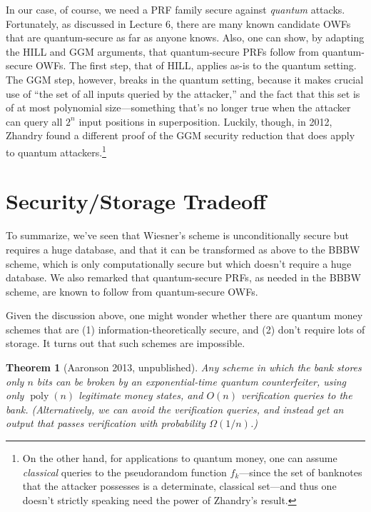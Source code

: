 \documentclass[12pt]{report}
\theoremstyle{plain}
\newtheorem{theorem}{Theorem}[section]
\theoremstyle{definition}
\newcommand{\poly}{\operatorname{poly}}
\begin{document}
In our case, of course, we need a PRF family secure against \emph{quantum} attacks.  Fortunately, as discussed in Lecture 6, there are many known candidate OWFs that are quantum-secure as far as anyone knows.  Also, one can show, by adapting the HILL and GGM arguments, that quantum-secure PRFs follow from quantum-secure OWFs.  The first step, that of HILL, applies as-is to the quantum setting.  The GGM step, however, breaks in the quantum setting, because it makes crucial use of ``the set of all inputs queried by the attacker,'' and the fact that this set is of at most polynomial size---something that's no longer true when the attacker can query all $2^n$ input positions in superposition.  Luckily, though, in 2012, Zhandry \cite{Zha12} found a different proof of the GGM security reduction that does apply to quantum attackers.\footnote{On the other hand, for applications to quantum money, one can assume {\em classical} queries to the pseudorandom function $f_k$---since the set of banknotes that the attacker possesses is a determinate, classical set---and thus one doesn't strictly speaking need the power of Zhandry's result.}

\section{Security/Storage Tradeoff}

To summarize, we've seen that Wiesner's scheme is unconditionally secure but requires a huge database, and that it can be transformed as above to the BBBW scheme, which is only computationally secure but which doesn't require a huge database.  We also remarked that quantum-secure PRFs, as needed in the BBBW scheme, are known to follow from quantum-secure OWFs.

Given the discussion above, one might wonder whether there are quantum money schemes that
are (1) information-theoretically secure, and (2) don't require lots of storage.  It turns out that such schemes are impossible.

\begin{theorem}[Aaronson 2013, unpublished]
\label{thm:sront_counterfeiter}
Any scheme in which the bank stores only $n$ bits can be broken by an exponential-time
quantum counterfeiter, using only $\poly(n)$ legitimate money states, and $O(n)$ verification queries to the bank. (Alternatively, we can avoid the verification queries, and instead get an output that passes verification with probability $\Omega(1/n)$.)
\end{theorem}
\end{document}
